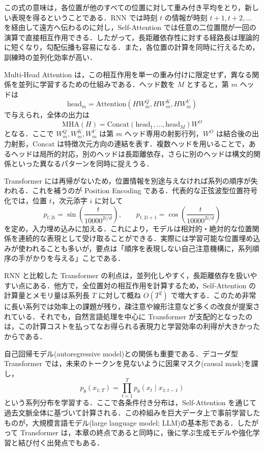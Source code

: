 この式の意味は，各位置が他のすべての位置に対して重み付き平均をとり，新しい表現を得るということである．RNN では時刻 $t$ の情報が時刻 $t+1,t+2,\dots$ を経由して遠方へ伝わるのに対し，Self-Attention では任意の二位置間が一回の演算で直接相互作用できる．したがって，長距離依存性に対する経路長は理論的に短くなり，勾配伝播も容易になる．また，各位置の計算を同時に行えるため，訓練時の並列化効率が高い．

Multi-Head Attention は，この相互作用を単一の重み付けに限定せず，異なる関係を並列に学習するための仕組みである．ヘッド数を $M$ とすると，第 $m$ ヘッドは
\begin{equation}
\mathrm{head}_m
= \mathrm{Attention}(HW_m^Q,HW_m^K,HW_m^V)
\end{equation}
で与えられ，全体の出力は
\begin{equation}
\mathrm{MHA}(H)
= \mathrm{Concat}(\mathrm{head}_1,\dots,\mathrm{head}_M)W^O
\end{equation}
となる．ここで $W_m^Q,W_m^K,W_m^V$ は第 $m$ ヘッド専用の射影行列，$W^O$ は結合後の出力射影，$\mathrm{Concat}$ は特徴次元方向の連結を表す．複数ヘッドを用いることで，あるヘッドは局所的対応，別のヘッドは長距離依存，さらに別のヘッドは構文的関係といった異なるパターンを同時に捉えうる．

Transformer には再帰がないため，位置情報を別途与えなければ系列の順序が失われる．これを補うのが Position Encoding である．代表的な正弦波型位置符号化では，位置 $t$，次元添字 $i$ に対して
\begin{equation}
p_{t,2i} = \sin\left(\frac{t}{10000^{2i/d}}\right),
\qquad
p_{t,2i+1} = \cos\left(\frac{t}{10000^{2i/d}}\right)
\end{equation}
を定め，入力埋め込みに加える．これにより，モデルは相対的・絶対的な位置関係を連続的な表現として受け取ることができる．実際には学習可能な位置埋め込みが使われることも多いが，要点は「順序を表現しない自己注意機構に，系列順序の手がかりを与える」ことである．

RNN と比較した Transformer の利点は，並列化しやすく，長距離依存を扱いやすい点にある．他方で，全位置対の相互作用を計算するため，Self-Attention の計算量とメモリ量は系列長 $T$ に対して概ね $O(T^2)$ で増大する．このため非常に長い系列では効率上の課題が残り，疎注意や線形注意など多くの改良が提案されている．それでも，自然言語処理を中心に Transformer が支配的となったのは，この計算コストを払ってなお得られる表現力と学習効率の利得が大きかったからである．

自己回帰モデル(autoregressive model)との関係も重要である．デコーダ型 Transformer では，未来のトークンを見ないように因果マスク(causal mask)を課し，
\begin{equation}
p_\theta(x_{1:T})
= \prod_{t=1}^T p_\theta(x_t\mid x_{1:t-1})
\end{equation}
という系列分布を学習する．ここで各条件付き分布は，Self-Attention を通じて過去文脈全体に基づいて計算される．この枠組みを巨大データ上で事前学習したものが，大規模言語モデル(large language model; LLM)の基本形である．したがって Transformer は，本章の終点であると同時に，後に学ぶ生成モデルや強化学習と結び付く出発点でもある．

